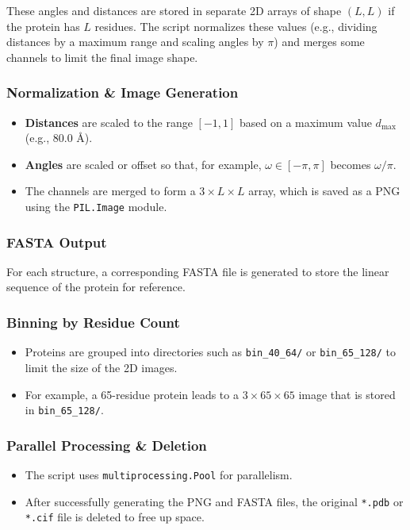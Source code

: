 \documentclass[11pt]{article}
\begin{document}
These angles and distances are stored in separate 2D arrays of shape $(L, L)$ if the protein has $L$ residues. The script normalizes these values (e.g., dividing distances by a maximum range and scaling angles by $\pi$) and merges some channels to limit the final image shape.

\subsubsection*{Normalization \& Image Generation}

\begin{itemize}
  \item \textbf{Distances} are scaled to the range \([-1, 1]\) based on a maximum value \( d_{\max} \) (e.g., 80.0 \AA).
  \item \textbf{Angles} are scaled or offset so that, for example, \(\omega \in [-\pi, \pi]\) becomes \(\omega/\pi\).
  \item The channels are merged to form a \(3 \times L \times L\) array, which is saved as a PNG using the \texttt{PIL.Image} module.
\end{itemize}

\subsubsection*{FASTA Output}

For each structure, a corresponding FASTA file is generated to store the linear sequence of the protein for reference.

\subsubsection*{Binning by Residue Count}

\begin{itemize}
  \item Proteins are grouped into directories such as \texttt{bin\_40\_64/} or \texttt{bin\_65\_128/} to limit the size of the 2D images.
  \item For example, a 65-residue protein leads to a \(3 \times 65 \times 65\) image that is stored in \texttt{bin\_65\_128/}.
\end{itemize}

\subsubsection*{Parallel Processing \& Deletion}

\begin{itemize}
  \item The script uses \texttt{multiprocessing.Pool} for parallelism.
  \item After successfully generating the PNG and FASTA files, the original \texttt{*.pdb} or \texttt{*.cif} file is deleted to free up space.
\end{itemize}
\end{document}

